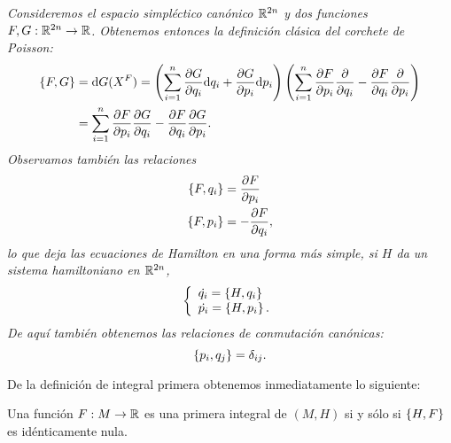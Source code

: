 \begin{ejemplo}
  \em
  Consideremos el espacio simpléctico canónico $\mathbb{R}^{2n}$ y dos funciones $F,G:\mathbb{R}^{2n} \rightarrow \mathbb{R}$. Obtenemos entonces la definición clásica del corchete de Poisson:
  \begin{align*}
    \left\lbrace F,G\right\rbrace & = \mathrm{d} G (X^F) = \left( \sum_{i=1}^n \frac{\partial G}{\partial q_i} \mathrm{d} q_i + \frac{\partial G}{\partial p_i} \mathrm{d} p_i \right) \left( \sum_{i=1}^n \frac{\partial F}{\partial p_i} \frac{\partial}{\partial q_i} - \frac{\partial F}{\partial q_i} \frac{\partial}{\partial p_i}\right) \\ 
    & =\sum_{i=1}^n \frac{\partial F}{\partial p_i} \frac{\partial G}{\partial q_i} - \frac{\partial F}{\partial q_i} \frac{\partial G}{\partial p_i}.
  \end{align*}
  Observamos también las relaciones
  \begin{align*}
    \left\lbrace F,q_i\right\rbrace &= \frac{\partial F}{\partial p_i} \\
    \left\lbrace F,p_i\right\rbrace &= -\frac{\partial F}{\partial q_i},
  \end{align*}
  lo que deja las ecuaciones de Hamilton en una forma más simple, si $H$ da un sistema hamiltoniano en $\mathbb{R}^{2n}$,
  \begin{equation*}
    \left\lbrace
    \begin{array}{l}
      \dot{q_i}=\left\lbrace H,q_i\right\rbrace \\
      \dot{p_i}=\left\lbrace H,p_i\right\rbrace.
    \end{array}
    \right.
  \end{equation*}
  De aquí también obtenemos las \emph{relaciones de conmutación canónicas}:
  \begin{equation*}
    \left\lbrace p_i,q_j\right\rbrace=\delta_{ij}.
  \end{equation*}
\end{ejemplo}

De la definición de integral primera obtenemos inmediatamente lo siguiente:
\begin{prop}
    Una función $F:M \rightarrow \mathbb{R}$ es una primera integral de $(M,H)$ si y sólo si $\left\lbrace H,F\right\rbrace$ es idénticamente nula.
\end{prop}

